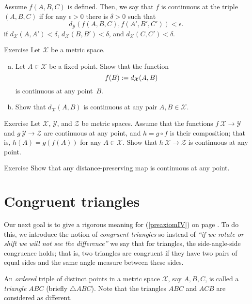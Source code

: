 Assume $f(A,B,C)$ is defined.
Then, we say that $f$ is continuous at the triple $(A,B,C)$ 
if for any $\epsilon>0$ there is $\delta>0$ such that 
\[d_{\mathcal Y}(f(A,B,C),f(A',B',C'))<\epsilon.\]
if $d_{\mathcal X}(A,A')<\delta$, $d_{\mathcal X}(B,B')<\delta$, and $d_{\mathcal X}(C,C')<\delta$.


\begin{thm}{Exercise}\label{ex:dist-cont}
Let $\mathcal{X}$ be a metric space.
\begin{enumerate}[(a)]
\item\label{ex:dist-cont:a} Let $A\in \mathcal{X}$ be a fixed point.
Show that the function 
$$f(B):=
d_{\mathcal{X}}(A,B)$$ 
is continuous at any point~$B$.
\item Show that $d_{\mathcal{X}}(A,B)$ is continuous at any pair $A,B\in \mathcal{X}$.
\end{enumerate}

\end{thm}

\begin{thm}{Exercise}\label{ex:comp+cont}
Let $\mathcal{X}$, $\mathcal{Y}$, and $\mathcal{Z}$ be metric spaces.
Assume that the functions $f\:\mathcal{X}\to\mathcal{Y}$
and $g\:\mathcal{Y}\to\mathcal{Z}$ are continuous at any point,
and $h=g\circ f$ is their composition;
that is, $h(A)=g(f(A))$ for any $A\in \mathcal{X}$.
Show that $h\:\mathcal{X}\to\mathcal{Z}$ is continuous at any point.
\end{thm}

\begin{thm}{Exercise}\label{ex:isom-cont}
Show that any distance-preserving map is continuous at any point.
\end{thm}




\section*{Congruent triangles} 

Our next goal is to give a rigorous meaning for (\ref{preaxiomIV}) on page \pageref{preaxiomIV}.
To do this, we introduce the notion of {}\emph{congruent triangles}
so instead of {}\emph{``if we rotate or shift we will not see the difference''} we say that for triangles, the side-angle-side congruence holds;
that is, two triangles are congruent if they have two pairs of equal sides and the same angle measure between these sides.

An {}\emph{ordered} triple of distinct points in a metric space $\mathcal{X}$, 
say $A,B,C$,
is called a \emph{triangle $ABC$}\label{page:def:triangle} (briefly $\triangle A B C$).
Note that the triangles $A B C$ and $A C B$ are considered as different.

